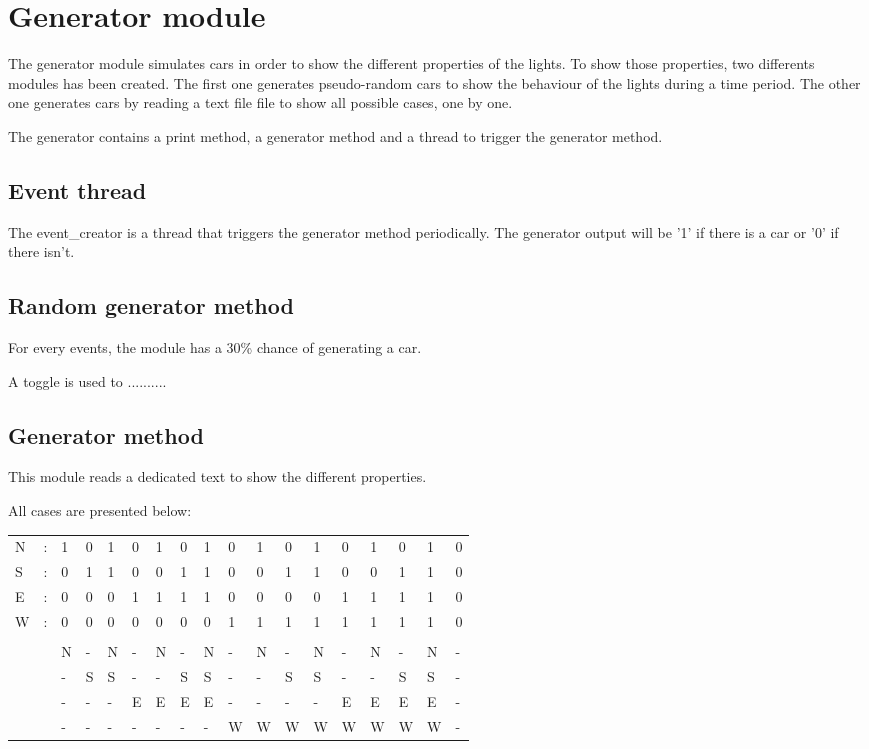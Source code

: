 \section{Generator module}

The generator module simulates cars in order to show the different properties of the lights. 
To show those properties, two differents modules has been created.
The first one generates pseudo-random cars to show the behaviour of the lights during a time period.
The other one generates cars by reading a text file file to show all possible cases, one by one. 

The generator contains a print method, a generator method and a thread to trigger the generator method.

\subsection{Event thread}

The event{\_}creator is a thread that triggers the generator method periodically. The generator output will be '1' if there is a car or  '0' if there isn't.

\subsection{Random generator method}

For every events, the module has a 30{\%} chance of generating a car.

A toggle is used to ..........

\subsection{Generator method}

This module reads a dedicated text to show the different properties. 

All cases are presented below: 

\begin{table}[]
\begin{tabular}{llllllllllllllllll}
N & : & 1 & 0 & 1 & 0 & 1 & 0 & 1 & 0 & 1 & 0 & 1 & 0 & 1 & 0 & 1 & 0 \\
S & : & 0 & 1 & 1 & 0 & 0 & 1 & 1 & 0 & 0 & 1 & 1 & 0 & 0 & 1 & 1 & 0 \\
E & : & 0 & 0 & 0 & 1 & 1 & 1 & 1 & 0 & 0 & 0 & 0 & 1 & 1 & 1 & 1 & 0 \\
W & : & 0 & 0 & 0 & 0 & 0 & 0 & 0 & 1 & 1 & 1 & 1 & 1 & 1 & 1 & 1 & 0 \\
  &   &   &   &   &   &   &   &   &   &   &   &   &   &   &   &   &   \\
  &   & N & - & N & - & N & - & N & - & N & - & N & - & N & - & N & - \\
  &   & - & S & S & - & - & S & S & - & - & S & S & - & - & S & S & - \\
  &   & - & - & - & E & E & E & E & - & - & - & - & E & E & E & E & - \\
  &   & - & - & - & - & - & - & - & W & W & W & W & W & W & W & W & -
\end{tabular}
\end{table}

